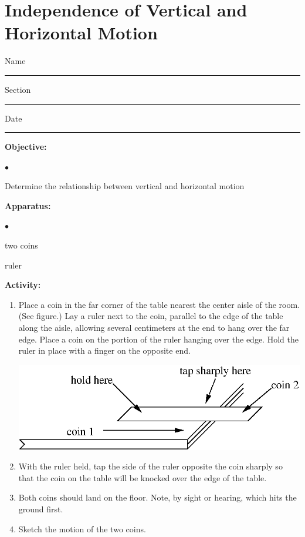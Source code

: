 
\section{Independence of Vertical and Horizontal Motion}

Name \rule{2.0in}{0.1pt}\hfill{}Section \rule{1.0in}{0.1pt}\hfill{}Date \rule{1.0in}{0.1pt}

{\noindent \bf Objective:} \begin{list}{$\bullet$}{\itemsep0pt }

\item Determine the relationship between vertical and horizontal motion

\end{list}

{\noindent \bf Apparatus:} \begin{list}{$\bullet$}{\itemsep0pt }

\item two coins \item ruler

\end{list}

{\noindent \bf Activity:} \begin{enumerate}

\item Place a coin in the far corner of the table nearest the center aisle of the room. (See figure.) Lay a ruler next to the coin, parallel to the edge of the table along the aisle, allowing several centimeters at the end to hang over the far edge. Place a coin on the portion of the ruler hanging over the edge. Hold the ruler in place with a finger on the opposite end.

\vspace{0.3cm}
{\par\centering \includegraphics{independence_fig1.eps} \par}
\vspace{0.3cm}

\item With the ruler held, tap the side of the ruler opposite the coin sharply so that the coin on the table will be knocked over the edge of the table.

\item Both coins should land on the floor. Note, by sight or hearing, which hits the ground first.

\item Sketch the motion of the two coins.

\end{enumerate}

